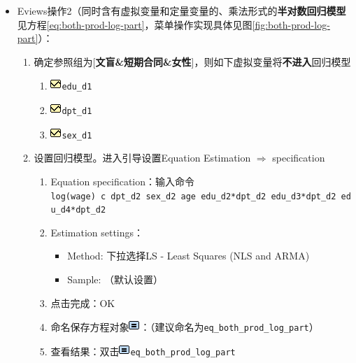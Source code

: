 \documentclass[12pt,(landscape,a4paper),(portrait,a4paper)]{article}
\providecommand{\tightlist}{%
  \setlength{\itemsep}{0pt}\setlength{\parskip}{0pt}}
\theoremstyle{definition}
\theoremstyle{definition}
\theoremstyle{definition}
\theoremstyle{remark}
\begin{document}
\begin{itemize}
\tightlist
\item
  Eviews操作2（同时含有虚拟变量和定量变量的、乘法形式的\textbf{半对数回归模型}见方程\eqref{eq:both-prod-log-part}，菜单操作实现具体见图\ref{fig:both-prod-log-part}）：

  \begin{enumerate}
  \def\labelenumi{\arabic{enumi})}
  \tightlist
  \item
    确定参照组为{[}\textbf{文盲\&短期合同\&女性}{]}，则如下虚拟变量将\textbf{不进入}回归模型

    \begin{enumerate}
    \def\labelenumii{\alph{enumii}.}
    \tightlist
    \item
      \includegraphics{picture/object/Series.png}\texttt{edu\_d1}
    \item
      \includegraphics{picture/object/Series.png}\texttt{dpt\_d1}
    \item
      \includegraphics{picture/object/Series.png}\texttt{sex\_d1}
    \end{enumerate}
  \item
    设置回归模型。进入引导设置Equation Estimation \(\Rightarrow\)
    specification

    \begin{enumerate}
    \def\labelenumii{\alph{enumii}.}
    \tightlist
    \item
      Equation
      specification：输入命令\texttt{log(wage)\ c\ dpt\_d2\ sex\_d2\ age\ edu\_d2*dpt\_d2\ edu\_d3*dpt\_d2\ edu\_d4*dpt\_d2}
    \item
      Estimation settings：

      \begin{itemize}
      \tightlist
      \item
        Method: 下拉选择LS - Least Squares (NLS and ARMA)
      \item
        Sample: （默认设置）
      \end{itemize}
    \item
      点击完成：OK
    \item
      命名保存方程对象\includegraphics{picture/object/Equation.png}：（建议命名为\texttt{eq\_both\_prod\_log\_part}）
    \item
      查看结果：双击\includegraphics{picture/object/Equation.png}\texttt{eq\_both\_prod\_log\_part}
    \end{enumerate}
  \end{enumerate}
\end{itemize}
\end{document}
